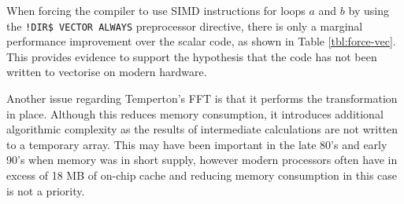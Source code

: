 \documentclass[a4paper,11pt]{report}
\begin{document}
\par
When forcing the compiler to use SIMD instructions for loops $a$ and $b$ by using the \texttt{!DIR\$ VECTOR ALWAYS} preprocessor directive, there is only a marginal performance improvement over the scalar code, as shown in Table \ref{tbl:force-vec}. This provides evidence to support the hypothesis that the code has not been written to vectorise on modern hardware. 
\par
Another issue regarding Temperton's FFT is that it performs the transformation in place. Although this reduces memory consumption, it introduces additional algorithmic complexity as the results of intermediate calculations are not written to a temporary array. This may have been important in the late 80's and early 90's when memory was in short supply, however modern processors often have in excess of 18 MB of on-chip cache and reducing memory consumption in this case is not a priority. 


\end{document}

